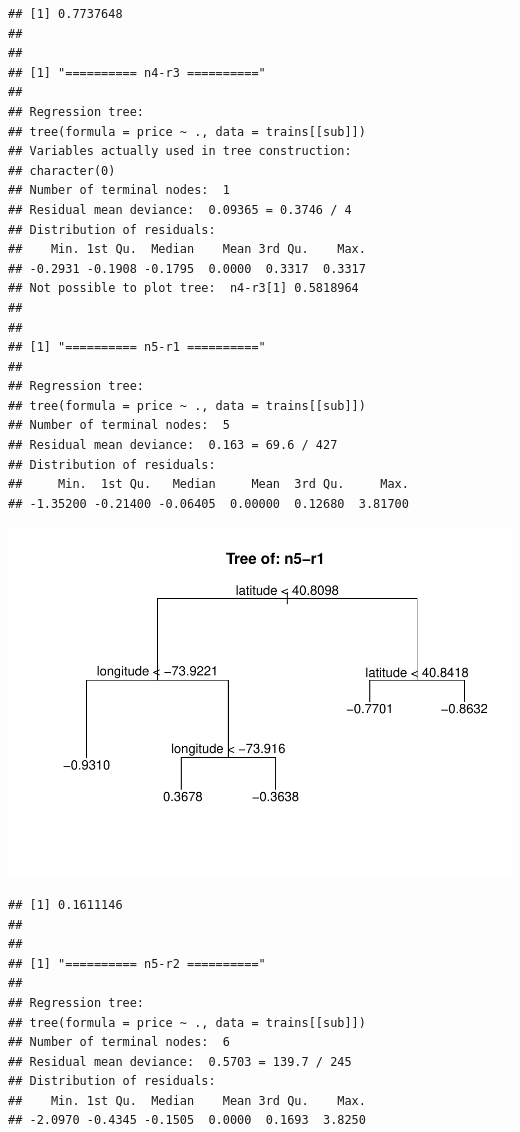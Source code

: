 \documentclass[
]{article}
\begin{document}
\begin{verbatim}
## [1] 0.7737648
## 
## 
## [1] "========== n4-r3 =========="
## 
## Regression tree:
## tree(formula = price ~ ., data = trains[[sub]])
## Variables actually used in tree construction:
## character(0)
## Number of terminal nodes:  1 
## Residual mean deviance:  0.09365 = 0.3746 / 4 
## Distribution of residuals:
##    Min. 1st Qu.  Median    Mean 3rd Qu.    Max. 
## -0.2931 -0.1908 -0.1795  0.0000  0.3317  0.3317 
## Not possible to plot tree:  n4-r3[1] 0.5818964
## 
## 
## [1] "========== n5-r1 =========="
## 
## Regression tree:
## tree(formula = price ~ ., data = trains[[sub]])
## Number of terminal nodes:  5 
## Residual mean deviance:  0.163 = 69.6 / 427 
## Distribution of residuals:
##     Min.  1st Qu.   Median     Mean  3rd Qu.     Max. 
## -1.35200 -0.21400 -0.06405  0.00000  0.12680  3.81700
\end{verbatim}

\includegraphics{project-code_files/figure-latex/unnamed-chunk-14-17.pdf}

\begin{verbatim}
## [1] 0.1611146
## 
## 
## [1] "========== n5-r2 =========="
## 
## Regression tree:
## tree(formula = price ~ ., data = trains[[sub]])
## Number of terminal nodes:  6 
## Residual mean deviance:  0.5703 = 139.7 / 245 
## Distribution of residuals:
##    Min. 1st Qu.  Median    Mean 3rd Qu.    Max. 
## -2.0970 -0.4345 -0.1505  0.0000  0.1693  3.8250
\end{verbatim}
\end{document}
